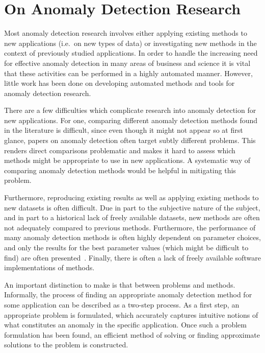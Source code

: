 \section{On Anomaly Detection Research}
\label{sect:on_ad_research}

Most anomaly detection research involves either applying existing methods to new applications (i.e.\ on new types of data) or investigating new methods in the context of previously studied applications. In order to handle the increasing need for effective anomaly detection in many areas of business and science it is vital that these activities can be performed in a highly automated manner. However, little work has been done on developing automated methods and tools for anomaly detection research.

There are a few difficulties which complicate research into anomaly detection for new applications. For one, comparing different anomaly detection methods found in the literature is difficult, since even though it might not appear so at first glance, papers on anomaly detection often target subtly different problems. This renders direct comparisons problematic and makes it hard to assess which methods might be appropriate to use in new applications. A systematic way of comparing anomaly detection methods would be helpful in mitigating this problem.

Furthermore, reproducing existing results as well as applying existing methods to new datasets is often difficult. Due in part to the subjective nature of the subject, and in part to a historical lack of freely available datasets, new methods are often not adequately compared to previous methods. Furthermore, the performance of many anomaly detection methods is often highly dependent on parameter choices, and only the results for the best parameter values (which might be difficult to find) are often presented~\cite{keogh5}. Finally, there is often a lack of freely available software implementations of methods.

An important distinction to make is that between problems and methods. Informally, the process of finding an appropriate anomaly detection method for some application can be described as a two-step process. As a first step, an appropriate problem is formulated, which accurately captures intuitive notions of what constitutes an anomaly in the specific application. Once such a problem formulation has been found, an efficient method of solving or finding approximate solutions to the problem is constructed.

